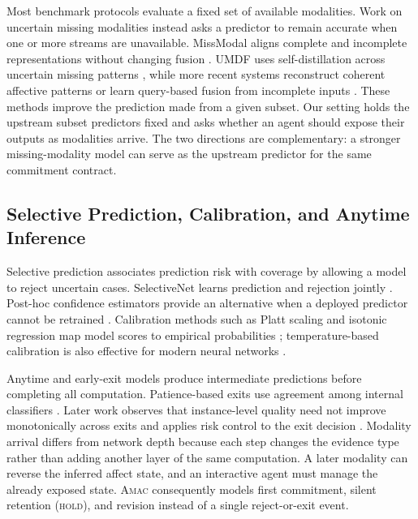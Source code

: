 \documentclass[journal]{IEEEtran}
\newcommand{\method}{\textsc{Amac}}
\begin{document}
Most benchmark protocols evaluate a fixed set of available modalities. Work on uncertain missing modalities instead asks a predictor to remain accurate when one or more streams are unavailable. MissModal aligns complete and incomplete representations without changing fusion \cite{lin2023missmodal}. UMDF uses self-distillation across uncertain missing patterns \cite{li2024umdf}, while more recent systems reconstruct coherent affective patterns or learn query-based fusion from incomplete inputs \cite{huang2026recap,miyoshi2026dqf}. These methods improve the prediction made from a given subset. Our setting holds the upstream subset predictors fixed and asks whether an agent should expose their outputs as modalities arrive. The two directions are complementary: a stronger missing-modality model can serve as the upstream predictor for the same commitment contract.

\subsection{Selective Prediction, Calibration, and Anytime Inference}

Selective prediction associates prediction risk with coverage by allowing a model to reject uncertain cases. SelectiveNet learns prediction and rejection jointly \cite{geifman2019selectivenet}. Post-hoc confidence estimators provide an alternative when a deployed predictor cannot be retrained \cite{cattelan2024confidence}. Calibration methods such as Platt scaling and isotonic regression map model scores to empirical probabilities \cite{platt1999probabilistic,zadrozny2002transforming}; temperature-based calibration is also effective for modern neural networks \cite{guo2017calibration}.

Anytime and early-exit models produce intermediate predictions before completing all computation. Patience-based exits use agreement among internal classifiers \cite{zhou2020pabee}. Later work observes that instance-level quality need not improve monotonically across exits \cite{jazbec2023anytime} and applies risk control to the exit decision \cite{jazbec2024risk}. Modality arrival differs from network depth because each step changes the evidence type rather than adding another layer of the same computation. A later modality can reverse the inferred affect state, and an interactive agent must manage the already exposed state. \method{} consequently models first commitment, silent retention (\textsc{hold}), and revision instead of a single reject-or-exit event.
\end{document}
